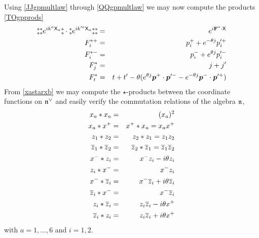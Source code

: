 Using \eqref{JJgpmultlaw} through \eqref{QQgpmultlaw} we may now compute the
products \eqref{TOgpprods}
\begin{eqnarray}
  \label{TOgpprodexpl}
  \mbox{$\substack{\ast\\\ast}$}  \mbox{$\substack{\ast\\\ast}$}  e^{ i k^a {\sf X}_a} \mbox{$\substack{\ast\\\ast}$}\cdot\mbox{$\substack{\ast\\\ast}$}  e^{ i k^{\prime a} {\sf X}_a}
  \mbox{$\substack{\ast\\\ast}$}  \mbox{$\substack{\ast\\\ast}$} &=& e^{i{\bf F}^\ast\cdot{\sf X}}\\\nonumber
  F^{\ast+}_i&=& p_i^++ e^{-\theta j} p_i^{\prime +}\\\nonumber
  F^{\ast-}_i&=& p_i^-+ e^{\theta j} p_i^{\prime -}\\\nonumber
  F^\ast_j&=& j+j'\\\nonumber
  F^\ast_t&=& t+t'-\theta ( e^{\theta j} {{\boldsymbol {p} }}^+\cdot{{\boldsymbol {p} }}^{\prime -}- e^{-\theta j}
  {{\boldsymbol {p} }}^-\cdot{{\boldsymbol {p} }}^{\prime +})
\end{eqnarray}
From \eqref{xastarxb} we may compute the $\star$-products between the coordinate
functions on ${\mathfrak n}^\vee$ and easily verify the commutation relations of the algebra
${\mathfrak n}$,
\begin{eqnarray}
  \label{TOcoordstarprods}
  x_a*x_a&=&(x_a)^2\\\nonumber
  x_a*x^+&=&x^+*x_a = x_a x^+\\\nonumber
  z_1*z_2&=&z_2*z_1 = z_1 z_2\\\nonumber
  \overline{z}_1*\overline{z}_2&=&\overline{z}_2*\overline{z}_1
  = \overline{z}_1 \overline{z}_2\\\nonumber
  x^-*z_i&=&x^- z_i- i\theta z_i\\\nonumber
  z_i*x^-&=&x^- z_i\\\nonumber
  x^-*\overline{z}_i&=&x^- \overline{z}_i+ i\theta \overline{z}_i\\\nonumber
  \overline{z}_i*x^-&=&x^- \overline{z}_i \\\nonumber
  z_i*\overline{z}_i&=&z_i \overline{z}_i- i\theta x^+\\\nonumber
  \overline{z}_i*z_i&=&z_i \overline{z}_i+ i\theta x^+
\end{eqnarray}
with $a=1,\dots,6$ and $i=1,2$.


